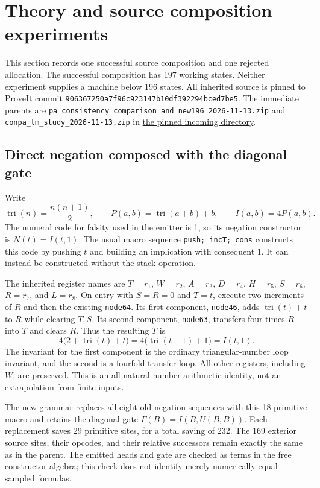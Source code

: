 \section{Theory and source composition experiments}
\label{sec:theory-composition}

This section records one successful source composition and one rejected
allocation.  The successful composition has 197 working states.  Neither
experiment supplies a machine below 196 states.  All inherited source is
pinned to ProveIt commit
\texttt{906367250a7f96c923147b10df392294bced7be5}.
The immediate parents are
\texttt{pa\_consistency\_comparison\_and\_new196\_2026-11-13.zip}
and \texttt{conpa\_tm\_study\_2026-11-13.zip} in
\href{https://github.com/VladimirReshetnikov/ProveIt/tree/906367250a7f96c923147b10df392294bced7be5/docs/incoming}{the pinned incoming directory}.

\subsection{Direct negation composed with the diagonal gate}

Write
\[
  \operatorname{tri}(n)=\frac{n(n+1)}2,\qquad
  P(a,b)=\operatorname{tri}(a+b)+b,\qquad
  I(a,b)=4P(a,b).
\]
The numeral code for falsity used in the emitter is 1, so its negation
constructor is $N(t)=I(t,1)$.  The usual macro sequence
\texttt{push; incT; cons} constructs this code by pushing $t$ and building
an implication with consequent 1.  It can instead be constructed without
the stack operation.

The inherited register names are $T=r_1$, $W=r_2$, $A=r_3$, $D=r_4$,
$H=r_5$, $S=r_6$, $R=r_7$, and $L=r_8$.
On entry with $S=R=0$ and $T=t$, execute two increments of $R$ and then
the existing \texttt{node64}.  Its first component, \texttt{node46},
adds $\operatorname{tri}(t)+t$ to $R$ while clearing $T,S$.
Its second component, \texttt{node63}, transfers four times $R$ into $T$
and clears $R$.  Thus the resulting $T$ is
\[
  4\bigl(2+\operatorname{tri}(t)+t\bigr)
  =4\bigl(\operatorname{tri}(t+1)+1\bigr)=I(t,1).
\]
The invariant for the first component is the ordinary triangular-number
loop invariant, and the second is a fourfold transfer loop.  All other
registers, including $W$, are preserved.  This is an all-natural-number
arithmetic identity, not an extrapolation from finite inputs.

The new grammar replaces all eight old negation sequences with this
18-primitive macro and retains the diagonal gate
$\Gamma(B)=I(B,U(B,B))$.  Each replacement saves 29 primitive sites,
for a total saving of 232.  The 169 exterior source sites, their opcodes,
and their relative successors remain exactly the same as in the parent.
The emitted heads and gate are checked as terms in the free constructor
algebra; this check does not identify merely numerically equal sampled
formulas.

